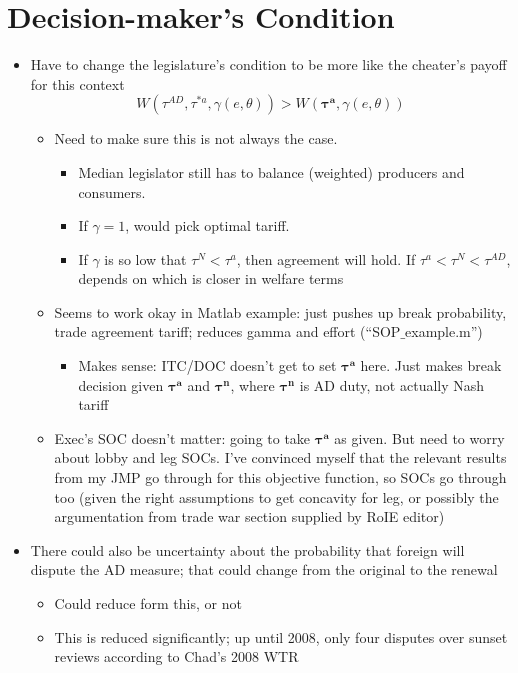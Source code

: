 \documentclass[12pt]{article}
\newcommand{\ta}{\theta}
\newcommand{\bta}{\bm{\tau^a}}
\newcommand{\btn}{\bm{\tau^n}}
\newcommand{\ga}{\gamma}
\begin{document}
\section{Decision-maker's Condition}
\begin{itemize}
	\item Have to change the legislature's condition to be more like the cheater's payoff for this context
		\[
		  W\left( \tau^{AD},\tau^{*a},\ga(e,\ta)\right) > W\left( \bta,\ga(e,\ta)\right)
		\]
		\begin{itemize}
			\item Need to make sure this is not always the case.
				\begin{itemize}
					\item Median legislator still has to balance (weighted) producers and consumers.
					\item If $\ga = 1$, would pick optimal tariff.
					\item If $\ga$ is so low that $\tau^N < \tau^a$, then agreement will hold. If $\tau^a < \tau^N < \tau^{AD}$, depends on which is closer in welfare terms 
				\end{itemize}
			\item Seems to work okay in Matlab example: just pushes up break probability, trade agreement tariff; reduces gamma and effort (``SOP$\_$example.m'')
				\begin{itemize}
					\item Makes sense: ITC/DOC doesn't get to set $\bta$ here. Just makes break decision given $\bta$ and $\btn$, where $\btn$ is AD duty, not actually Nash tariff
				\end{itemize}
			\item Exec's SOC doesn't matter: going to take $\bta$ as given. But need to worry about lobby and leg SOCs. I've convinced myself that the relevant results from my JMP go through for this objective function, so SOCs go through too (given the right assumptions to get concavity for leg, or possibly the argumentation from trade war section supplied by RoIE editor)
		\end{itemize}
	\item There could also be uncertainty about the probability that foreign will dispute the AD measure; that could change from the original to the renewal
		\begin{itemize}
			\item Could reduce form this, or not
			\item This is reduced significantly; up until 2008, only four disputes over sunset reviews according to Chad's 2008 WTR
		\end{itemize}
\end{itemize}
\end{document}
